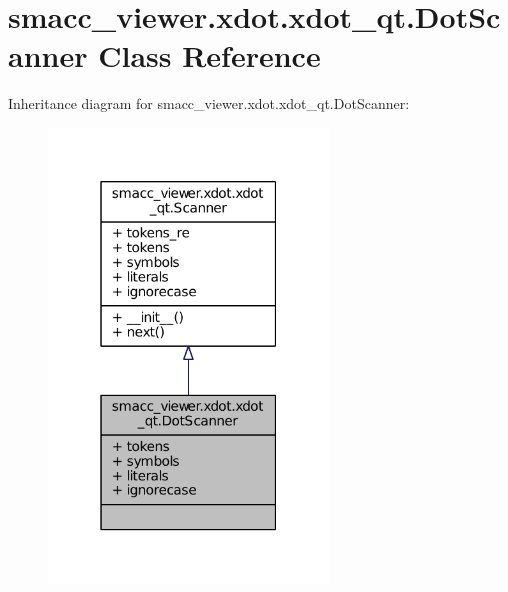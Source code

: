 \hypertarget{classsmacc__viewer_1_1xdot_1_1xdot__qt_1_1DotScanner}{}\section{smacc\+\_\+viewer.\+xdot.\+xdot\+\_\+qt.\+Dot\+Scanner Class Reference}
\label{classsmacc__viewer_1_1xdot_1_1xdot__qt_1_1DotScanner}


Inheritance diagram for smacc\+\_\+viewer.\+xdot.\+xdot\+\_\+qt.\+Dot\+Scanner\+:
\nopagebreak
\begin{figure}[H]
\begin{center}
\leavevmode
\includegraphics[width=211pt]{classsmacc__viewer_1_1xdot_1_1xdot__qt_1_1DotScanner__inherit__graph}
\end{center}
\end{figure}


